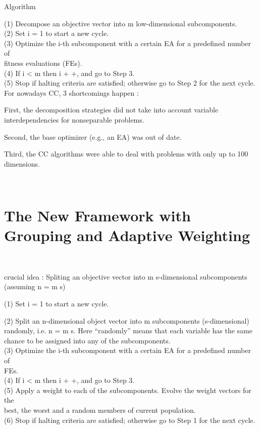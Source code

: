 \documentclass{article}
\begin{document}
Algorithm

(1) Decompose an objective vector into m low-dimensional subcomponents.\\
(2) Set i = 1 to start a new cycle.\\
(3) Optimize the i-th subcomponent with a certain EA for a predefined number
of\\
fitness evaluations (FEs).\\
(4) If i < m then i + +, and go to Step 3.\\
(5) Stop if halting criteria are satisfied; otherwise go to Step 2 for the
next cycle.\\


For nowadays CC, 3 shortcomings happen :

First, the decomposition strategies did not take into account variable
interdependencies for nonseparable problems.

Second, the base optimizer (e.g., an EA) was out of date.

Third, the CC algorithms were able to deal with problems with only up to 100
dimensions.

\

\section{The New Framework with Grouping and Adaptive Weighting}

\

crucial idea : Spliting an objective vector into m s-dimensional
subcomponents (assuming n = m {\ast} s)

(1) Set i = 1 to start a new cycle.

(2) Split an n-dimensional object vector into m subcomponents (s-dimensional)
randomly, i.e. n = m {\ast} s. Here ``randomly'' means that each variable has
the same\\
chance to be assigned into any of the subcomponents.\\
(3) Optimize the i-th subcomponent with a certain EA for a predefined number
of\\
FEs.\\
(4) If i < m then i + +, and go to Step 3.\\
(5) Apply a weight to each of the subcomponents. Evolve the weight vectors for
the\\
best, the worst and a random members of current population.\\
(6) Stop if halting criteria are satisfied; otherwise go to Step 1 for the
next cycle.\\
\end{document}
